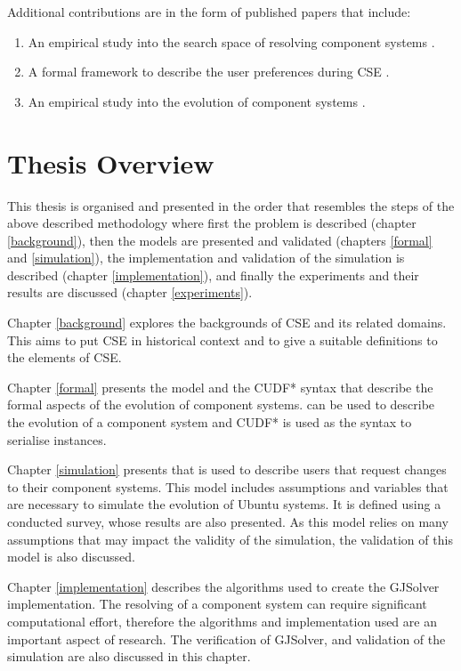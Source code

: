 Additional contributions are in the form of published papers that include:
\begin{enumerate}
  \item An empirical study into the search space of resolving component systems \citep{Jenson2010}.
  \item A formal framework to describe the user preferences during CSE \citep{Jenson2010a}.
  \item An empirical study into the evolution of component systems \citep{jenson2011}.
\end{enumerate}

\section{Thesis Overview}
This thesis is organised and presented in the order that resembles the steps of the above described methodology
where first the problem is described (chapter \ref{background}), then the models are presented and validated (chapters \ref{formal} and \ref{simulation}),
the implementation and validation of the simulation is described (chapter \ref{implementation}), and finally the experiments and their results are discussed (chapter \ref{experiments}).  

Chapter \ref{background} explores the backgrounds of CSE and its related domains.
This aims to put CSE in historical context and to give a suitable definitions to the elements of CSE.

Chapter \ref{formal} presents the \modelname model and the CUDF* syntax that describe the formal aspects of the evolution of component systems.
\modelname can be used to describe the evolution of a component system and CUDF* is used as the syntax to serialise \modelname instances.

Chapter \ref{simulation} presents \usermodel that is used to describe users that request changes to their component systems.
This model includes assumptions and variables that are necessary to simulate the evolution of Ubuntu systems. 
It is defined using a conducted survey, whose results are also presented.
As this model relies on many assumptions that may impact the validity of the simulation, the validation of this model is also discussed. 

Chapter \ref{implementation} describes the algorithms used to create the GJSolver implementation.
The resolving of a component system can require significant computational effort,
therefore the algorithms and implementation used are an important aspect of research.
The verification of GJSolver, and validation of the simulation are also discussed in this chapter.

